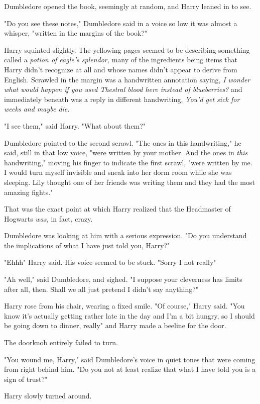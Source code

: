 Dumbledore opened the book, seemingly at random, and Harry leaned in to see.

"Do you see these notes," Dumbledore said in a voice so low it was almost a
whisper, "written in the margins of the book?"

Harry squinted slightly. The yellowing pages seemed to be describing something
called a \emph{potion of eagle's splendor,} many of the ingredients being
items that Harry didn't recognize at all and whose names didn't appear to
derive from English. Scrawled in the margin was a handwritten annotation
saying, \emph{I wonder what would happen if you used Thestral blood here
instead of blueberries?} and immediately beneath was a reply in different
handwriting, \emph{You'd get sick for weeks and maybe die.}

"I see them," said Harry. "What about them?"

Dumbledore pointed to the second scrawl. "The ones in this handwriting," he
said, still in that low voice, "were written by your mother. And the ones in
\emph{this} handwriting," moving his finger to indicate the first scrawl, "were
written by me. I would turn myself invisible and sneak into her dorm room while
she was sleeping. Lily thought one of her friends was writing them and they had
the most amazing fights."

That was the exact point at which Harry realized that the Headmaster of
Hogwarts \emph{was,} in fact, crazy.

Dumbledore was looking at him with a serious expression. "Do you understand the
implications of what I have just told you, Harry?"

"Ehhh{\el}" Harry said. His voice seemed to be stuck. "Sorry{\el}
I{\el} not really{\el}"

"Ah well," said Dumbledore, and sighed. "I suppose your cleverness has limits
after all, then. Shall we all just pretend I didn't say anything?"

Harry rose from his chair, wearing a fixed smile. "Of course," Harry said. "You
know it's actually getting rather late in the day and I'm a bit hungry, so I
should be going down to dinner, really" and Harry made a beeline for the door.

The doorknob entirely failed to turn.

"You wound me, Harry," said Dumbledore's voice in quiet tones that were coming
from right behind him. "Do you not at least realize that what I have told you
is a sign of trust?"

Harry slowly turned around.

